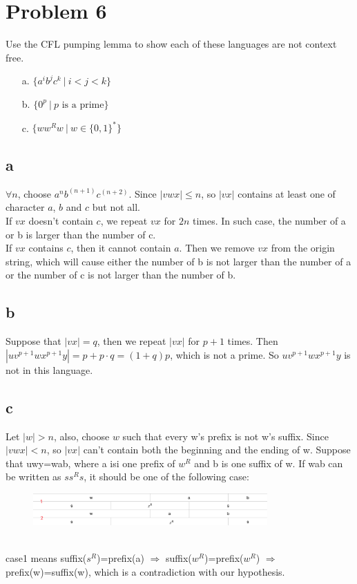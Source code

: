 \documentclass[a4paper,UTF8]{ctexart}
\theoremstyle{definition}
\begin{document}
\section*{Problem 6}
Use the CFL pumping lemma to show each of these languages are not context free.
\begin{enumerate}
	\item[a.] $\{a^ib^jc^k\ |\ i < j < k\}$
	\item[b.] $\{0^p\ |\ p\mbox{ is a prime}\}$
	\item[c.] $\{ww^Rw\ |\ w \in \{0,1\}^* \}$
\end{enumerate}

\subsection*{a}

$\forall n$, choose $a^nb^(n+1)c^(n+2)$. Since $|vwx|\leq n$, so 
$|vx|$ contains at least one of character $a$, $b$ and $c$ but not all.\\
If $vx$ doesn't contain $c$, we repeat $vx$ for $2n$ times. In such case, the number
of a or b is larger than the number of c.\\
If $vx$ contains $c$, then it cannot contain $a$. Then we remove $vx$ from the origin string,
which will cause either the number of b is not larger than the number of a or
the number of c is not larger than the number of b.

\subsection*{b}
Suppose that $|vx|=q$, then we repeat $|vx|$ for $p+1$ times.
Then $|uv^{p+1}wx^{p+1}y|=p+p\cdot q =(1+q)p $, which is not a prime. So $uv^{p+1}wx^{p+1}y$ is not in this language.

\subsection*{c}
Let $|w|>n$, also, choose $w$ such that every w's prefix is not w's suffix. 
Since $|vwx|<n$, so $|vx|$ can't contain both the beginning and the ending of w.
Suppose that uwy=wab, where a isi one prefix of $w^R$ and b is one suffix of w.
If wab can be written as $ss^Rs$, it should be one of the following case:
\begin{figure}[!h]
  \includegraphics[width=0.8\textwidth]{ssr.png}
\end{figure}\\
case1 means suffix($s^R$)=prefix(a) $\Rightarrow$ suffix($w^R$)=prefix($w^R$)
$\Rightarrow$ prefix(w)=suffix(w), which is a contradiction with our hypothesis.
\end{document}
